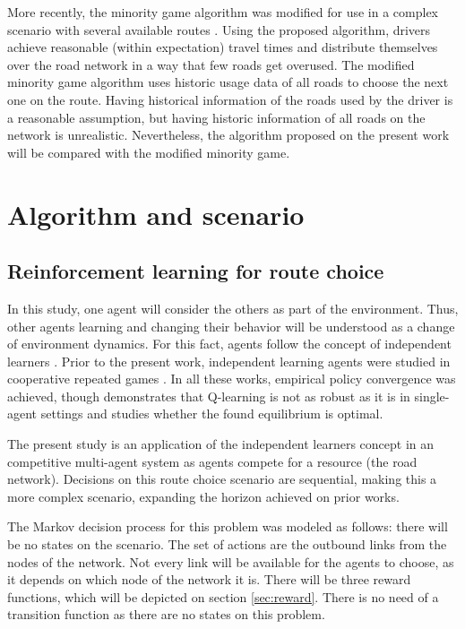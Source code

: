 \documentclass[12pt]{article}
\begin{document}
More recently, the minority game algorithm was modified for use in a complex scenario with several available routes \cite{Galib&Moser2011}. Using the proposed algorithm, drivers achieve reasonable (within expectation) travel times and distribute themselves over the road network in a way that few roads get overused. The modified minority game algorithm uses historic usage data of all roads to choose the next one on the route. Having historical information of the roads used by the driver is a reasonable assumption, but having historic information of all roads on the network is unrealistic. Nevertheless, the algorithm proposed on the present work will be compared with the modified minority game. 

\section{Algorithm and scenario}
\label{sec:proposal}

\subsection{Reinforcement learning for route choice}

In this study, one agent will consider the others as part of the environment. Thus, other agents learning and changing their behavior will be understood as a change of environment dynamics. For this fact, agents follow the concept of independent learners \cite{Claus&Boutilier1998}. Prior to the present work, independent learning agents were studied in cooperative repeated games \cite{Claus&Boutilier1998, Tan1993, Sen+1994}. In all these works, empirical policy convergence was achieved, though \cite{Claus&Boutilier1998} demonstrates that Q-learning is not as robust as it is in single-agent settings and studies whether the found equilibrium is optimal.

The present study is an application of the independent learners concept in an competitive multi-agent system as agents compete for a resource (the road network). Decisions on this route choice scenario are sequential, making this a more complex scenario, expanding the horizon achieved on prior works.

The Markov decision process for this problem was modeled as follows: there will be no states on the scenario. The set of actions are the outbound links from the nodes of the network. Not every link will be available for the agents to choose, as it depends on which node of the network it is. There will be three reward functions, which will be depicted on section \ref{sec:reward}. There is no need of a transition function as there are no states on this problem.
\end{document}
